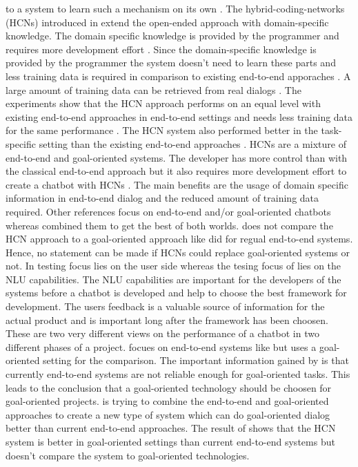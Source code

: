 to a system to learn such a mechanism on its own \cite{williams2017hybrid}.
The hybrid-coding-networks (HCNs) introduced in \citet{williams2017hybrid} extend the open-ended approach 
with domain-specific knowledge. 
The domain specific knowledge is provided by the programmer and requires more development effort \cite{williams2017hybrid}.
Since the domain-specific knowledge is provided by the programmer the system doesn't need to learn 
these parts and less training data is required in comparison to existing end-to-end apporaches \cite{williams2017hybrid}.
A large amount of training data can be retrieved from real dialogs \cite{williams2017hybrid}.
The experiments show that the HCN approach performs on an equal level with 
existing end-to-end approaches in end-to-end settings and needs less training data for 
the same performance \cite{williams2017hybrid}. 
The HCN system also performed better in the task-specific setting than the existing end-to-end approaches \cite{williams2017hybrid}.
HCNs are a mixture of end-to-end and goal-oriented systems.
The developer has more control than with the classical end-to-end approach but 
it also requires more development effort to create a chatbot with HCNs \cite{williams2017hybrid}.
The main benefits are the usage of domain specific information in end-to-end dialog 
and the reduced amount of training data required.
Other references focus on end-to-end and/or goal-oriented chatbots whereas \citet{williams2017hybrid} combined them 
to get the best of both worlds.
\citet{williams2017hybrid} does not compare the HCN approach to a goal-oriented approach like \citet{bordes2016learning} did
for regual end-to-end systems.
Hence, no statement can be made if HCNs could replace goal-oriented systems or not.
In \citet{evaluateChatbotsShawar2007} testing focus lies on the user side whereas the tesing focus of 
\citet{braunEvaluatingNLU} lies on the NLU capabilities.
The NLU capabilities are important for the developers of the systems before a chatbot
is developed and help to choose the best framework for development.
The users feedback is a valuable source of information for the actual product and
is important long after the framework has been choosen.
These are two very different views on the performance of a chatbot in two different phases of a project.
\citet{bordes2016learning} focues on end-to-end systems like \citet{evaluateChatbotsShawar2007, williams2017hybrid}
but uses a goal-oriented setting for the comparison.
The important information gained by \citet{bordes2016learning} is that currently end-to-end systems 
are not reliable enough for goal-oriented tasks.
This leads to the conclusion that a goal-oriented technology should be choosen for goal-oriented 
projects.
\citet{williams2017hybrid} is trying to combine the end-to-end and goal-oriented approaches to 
create a new type of system which can do goal-oriented dialog better than current end-to-end
approaches. 
The result of \citet{williams2017hybrid} shows that the HCN system is better in goal-oriented 
settings than current end-to-end systems but doesn't compare the system to goal-oriented technologies.

